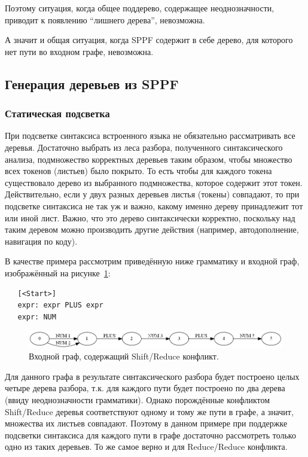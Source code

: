 Поэтому ситуация, когда общее поддерево, содержащее неоднозначности, приводит к появлению ``лишнего дерева'', невозможна. 

А значит и общая ситуация, когда SPPF содержит в себе дерево, для которого нет пути во входном графе, невозможна.

\subsection{Генерация деревьев из SPPF}
\subsubsection{Статическая подсветка}
При подсветке синтаксиса встроенного языка не обязательно рассматривать все деревья. Достаточно выбрать из леса разбора, полученного синтаксического анализа, подмножество корректных деревьев таким образом, чтобы множество всех токенов (листьев) было покрыто. То есть чтобы для каждого токена существовало дерево из выбранного подмножества, которое содержит этот токен. Действительно, если у двух разных деревьев листья (токены) совпадают, то при подсветке синтаксиса не так уж и важно, какому именно дереву принадлежит тот или иной лист. Важно, что это дерево синтаксически корректно, поскольку над таким деревом можно производить другие действия (например, автодополнение, навигация по коду).

В качестве примера рассмотрим приведённую ниже грамматику и входной граф, изображённый на рисунке~\ref{shift_reduce_conflict}:

\begin{verbatim}
   [<Start>]
   expr: expr PLUS expr 
   expr: NUM
\end{verbatim}

\begin{figure}[t]
\centering
\includegraphics[width=\linewidth]{Ivanov/Pictures/conflict.png}
\caption{Входной граф, содержащий Shift/Reduce конфликт.}
\label{shift_reduce_conflict}
\end{figure}

Для данного графа в результате синтаксического разбора будет построено целых четыре дерева разбора, т.к. для каждого пути будет построено по два дерева (ввиду неоднозначности грамматики). Однако порождённые конфликтом Shift/Reduce деревья соответствуют одному и тому же пути в графе, а значит, множества их листьев совпадают. Поэтому в данном примере при поддержке подсветки синтаксиса для каждого пути в графе достаточно рассмотреть только одно из таких деревьев. То же самое верно и для Reduce/Reduce конфликта. 

